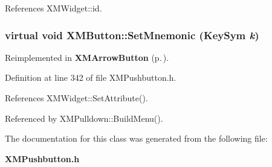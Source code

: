 References XMWidget::id.
\subsubsection{\setlength{\rightskip}{0pt plus 5cm}virtual void XMButton::Set\-Mnemonic (Key\-Sym {\em k})\hspace{0.3cm}{\tt  [inline, virtual]}}\label{classXMButton_a4}




Reimplemented in {\bf XMArrow\-Button} {\rm (p.\,\pageref{classXMArrowButton_a10})}.

Definition at line 342 of file XMPushbutton.h.

References XMWidget::Set\-Attribute().

Referenced by XMPulldown::Build\-Menu().

The documentation for this class was generated from the following file:\begin{CompactItemize}
\item 
{\bf XMPushbutton.h}\end{CompactItemize}
